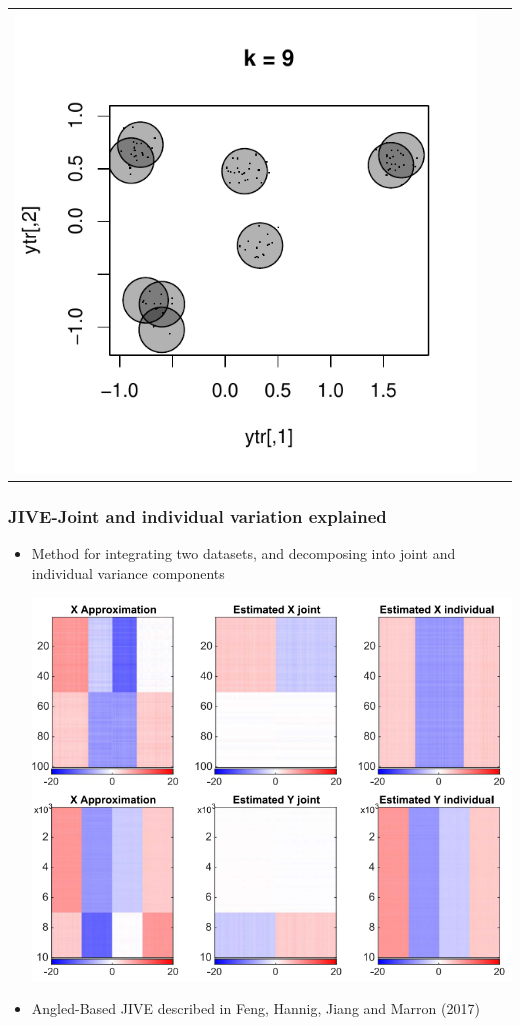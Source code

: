 \documentclass{beamer}
\begin{document}
\begin{frame}
\begin{center}
\begin{tabular}{ccc}
\includegraphics[scale = \scalesize, clip = true, trim = 0.3in 0.4in 0.3in 0.2in]{../conformal_kmeans/k9.pdf} \\
\end{tabular}
\end{center}
\end{frame}


\begin{frame}
\frametitle{JIVE-Joint and individual variation explained}
\begin{itemize}
\item Method for integrating two datasets, and decomposing into joint and individual variance components
\begin{center}
\includegraphics[scale = 0.25]{jsm_figs/jive_decomposition.png}
\end{center}
\item Angled-Based JIVE described in Feng, Hannig, Jiang and Marron (2017)
\end{itemize}
\end{frame}
\end{document}
